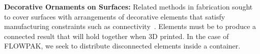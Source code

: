 \newtext
{
\textbf{Decorative Ornaments on Surfaces:} 
Related methods in fabrication  sought to cover surfaces with
arrangements of decorative elements that satisfy manufacturing
constraints such as connectivity~\cite{Chen2016, Zehnder2016, Bian2018, Martinez2019}.
Elements must be  to produce a connected result
that will hold together when 3D printed.
In the case of FLOWPAK, we seek to distribute disconnected elements inside a container.
}

